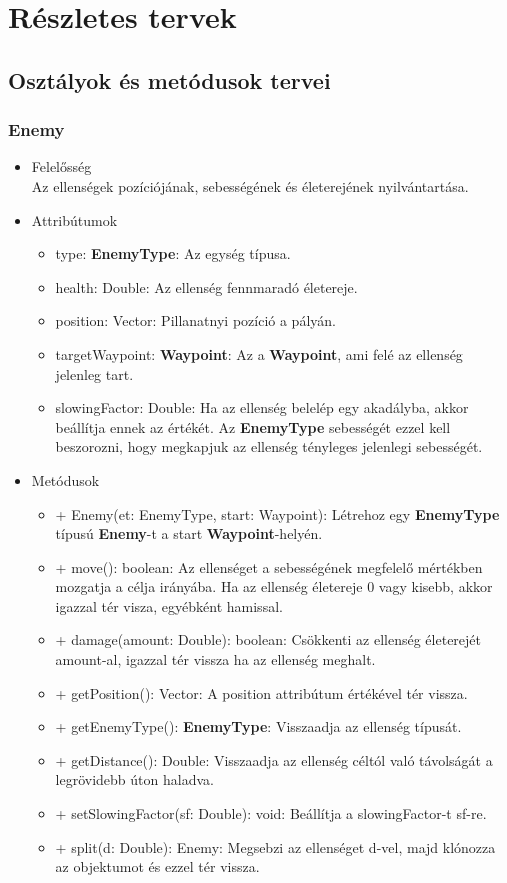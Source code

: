 %
\chapter{Részletes tervek}

\thispagestyle{fancy}

\section{Osztályok és metódusok tervei}

\subsection{Enemy}
\begin{itemize}
\item Felelősség\\
Az ellenségek pozíciójának, sebességének és életerejének nyilvántartása.
\item Attribútumok
	\begin{itemize}
		\item type: \textbf{EnemyType}: Az egység típusa.
		\item health: Double: Az ellenség fennmaradó életereje.
		\item position: Vector: Pillanatnyi pozíció a pályán.
		\item targetWaypoint: \textbf{Waypoint}: Az a \textbf{Waypoint}, ami felé az ellenség jelenleg tart.
		\item slowingFactor: Double: Ha az ellenség belelép egy akadályba, akkor beállítja ennek az értékét. Az \textbf{EnemyType} sebességét ezzel kell beszorozni, hogy megkapjuk az ellenség tényleges jelenlegi sebességét.
	\end{itemize}
\item Metódusok
	\begin{itemize}
		\item + Enemy(et: EnemyType, start: Waypoint): Létrehoz egy \textbf{EnemyType} típusú \textbf{Enemy}-t a start \textbf{Waypoint}-helyén.
		\item + move(): boolean: Az ellenséget a sebességének megfelelő mértékben mozgatja a célja irányába. Ha az ellenség életereje 0 vagy kisebb, akkor igazzal tér visza, egyébként hamissal.
		\item + damage(amount: Double): boolean: Csökkenti az ellenség életerejét amount-al, igazzal tér vissza ha az ellenség meghalt.
		\item + getPosition(): Vector: A position attribútum értékével tér vissza.
		\item + getEnemyType(): \textbf{EnemyType}: Visszaadja az ellenség típusát.
		\item + getDistance(): Double: Visszaadja az ellenség céltól való távolságát a legrövidebb úton haladva.
		\item + setSlowingFactor(sf: Double): void: Beállítja a slowingFactor-t sf-re.
		\item + split(d: Double): Enemy: Megsebzi az ellenséget d-vel, majd klónozza az objektumot és ezzel tér vissza.
	\end{itemize}
\end{itemize}


